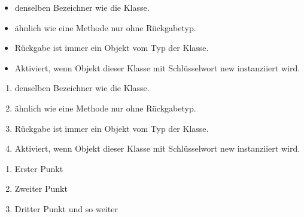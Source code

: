 \documentclass{article}
\begin{document}
\begin{itemize}[label=$\bullet$]
    \item denselben Bezeichner wie die Klasse. 
    \item ähnlich wie eine Methode nur ohne Rückgabetyp.
    \item Rückgabe ist immer ein Objekt vom Typ der Klasse.
    \item Aktiviert, wenn Objekt dieser Klasse mit Schlüsselwort new instanziiert wird.
\end{itemize}

\begin{enumerate}[label=\arabic*.]
    \item denselben Bezeichner wie die Klasse. 
    \item ähnlich wie eine Methode nur ohne Rückgabetyp.
    \item Rückgabe ist immer ein Objekt vom Typ der Klasse.
    \item Aktiviert, wenn Objekt dieser Klasse mit Schlüsselwort new instanziiert wird.
\end{enumerate}

\begin{enumerate}[label=\alph*)]
    \item Erster Punkt
    \item Zweiter Punkt
    \item Dritter Punkt und so weiter
\end{enumerate}
\end{document}
